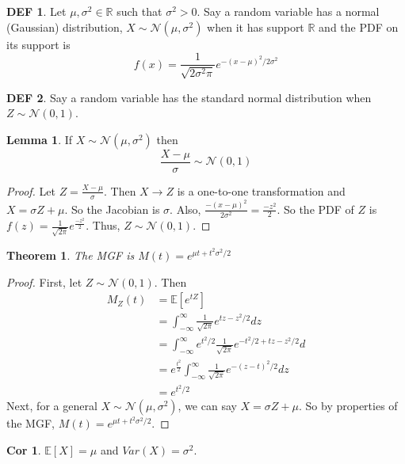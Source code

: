 \documentclass{article}
\newtheorem{theorem}{Theorem}
\theoremstyle{definition}\newtheorem{definition}{DEF}
\theoremstyle{definition}\newtheorem{example}{Ex}
\theoremstyle{lemma}\newtheorem{lemma}{Lemma}
\theoremstyle{corrolary}\newtheorem{corrolary}{Cor}
\begin{document}
\begin{definition}\label{gaussian}
Let $\mu, \sigma^2 \in \mathbb{R}$ such that $\sigma^2>0$.
Say a random variable has a normal (Gaussian) distribution, $X\sim \mathcal{N}(\mu,\sigma^2)$ when it has support $\mathbb{R}$ and the PDF on its support is
\begin{equation}
f(x)=\frac{1}{\sqrt{2\sigma^2 \pi}}e^{-(x-\mu)^2/2\sigma^2}
\end{equation}
\end{definition}

\begin{definition}
Say a random variable has the standard normal distribution when $Z\sim \mathcal{N}(0,1)$.
\end{definition}

\begin{lemma}
If $X\sim \mathcal{N}(\mu, \sigma^2)$ then
\begin{equation}
\frac{X-\mu}{\sigma}\sim \mathcal{N}(0,1)
\end{equation}
\end{lemma}
\begin{proof}
Let $Z=\frac{X-\mu}{\sigma}$.
Then $X\rightarrow Z$ is a one-to-one transformation and $X=\sigma Z+\mu$.
So the Jacobian is $\sigma$.
Also, $\frac{-(x-\mu)^2}{2\sigma^2}=\frac{-z^2}{2}$.
So the PDF of $Z$ is $f(z)=\frac{1}{\sqrt{2\pi}}e^\frac{-z^2}{2}$.
Thus, $Z\sim \mathcal{N}(0,1)$.
\end{proof}

\begin{theorem}
The MGF is $M(t)=e^{\mu t+{t^2\sigma^2/2}}$
\end{theorem}
\begin{proof}
First, let $Z\sim \mathcal{N}(0,1)$.
Then
\begin{align*}
M_Z(t)&=\mathbb{E}[e^{tZ}]\\
&=\int_{-\infty}^\infty \frac{1}{\sqrt{2\pi}}e^{tz-{z^2/2}}dz\\
&=\int_{-\infty}^\infty e^{t^2/2}\frac{1}{\sqrt{2\pi}}e^{{-t^2/2}+tz-{z^2/2}}d\\
&=e^\frac{t^2}{2}\int_{-\infty}^\infty \frac{1}{\sqrt{2\pi}} e^{-(z-t)^2/2}dz\\
&=e^{t^2/2}
\end{align*}
Next, for a general $X\sim \mathcal{N}(\mu, \sigma^2)$, we can say $X=\sigma Z+\mu$.
So by properties of the MGF, $M(t)=e^{\mu t+{t^2\sigma^2/2}}$.
\end{proof}
\begin{corrolary}
$\mathbb{E}[X]=\mu$ and $Var(X)=\sigma^2$.
\end{corrolary}
\end{document}
